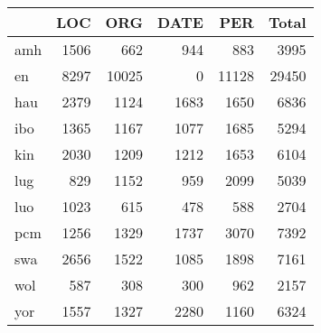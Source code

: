 \begin{tabular}{lrrrrr}
\toprule
{} &   LOC &    ORG &  DATE &    PER &  Total \\
\midrule
amh &  1506 &    662 &   944 &    883 &   3995 \\
en  &  8297 &  10025 &     0 &  11128 &  29450 \\
hau &  2379 &   1124 &  1683 &   1650 &   6836 \\
ibo &  1365 &   1167 &  1077 &   1685 &   5294 \\
kin &  2030 &   1209 &  1212 &   1653 &   6104 \\
lug &   829 &   1152 &   959 &   2099 &   5039 \\
luo &  1023 &    615 &   478 &    588 &   2704 \\
pcm &  1256 &   1329 &  1737 &   3070 &   7392 \\
swa &  2656 &   1522 &  1085 &   1898 &   7161 \\
wol &   587 &    308 &   300 &    962 &   2157 \\
yor &  1557 &   1327 &  2280 &   1160 &   6324 \\
\bottomrule
\end{tabular}
